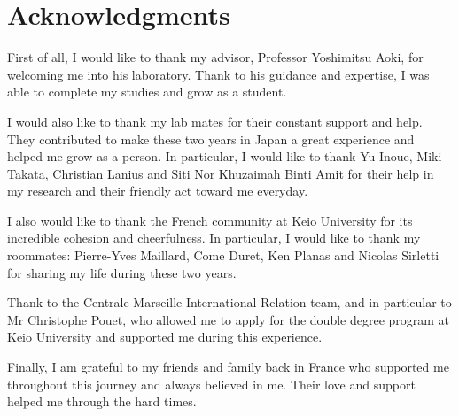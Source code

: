 \chapter*{Acknowledgments}
First of all, I would like to thank my advisor, Professor Yoshimitsu Aoki, for welcoming me into his laboratory. Thank to his guidance and expertise, I was able to complete my studies and grow as a student.

I would also like to thank my lab mates for their constant support and help. They contributed to make these two years in Japan a great experience and helped me grow as a person. In particular, I would like to thank Yu Inoue, Miki Takata, Christian Lanius and Siti Nor Khuzaimah Binti Amit for their help in my research and their friendly act toward me everyday.

I also would like to thank the French community at Keio University for its incredible cohesion and cheerfulness. In particular, I would like to thank my roommates: Pierre-Yves Maillard, Come Duret, Ken Planas and Nicolas Sirletti for sharing my life during these two years.

Thank to the Centrale Marseille International Relation team, and in particular to Mr Christophe Pouet, who allowed me to apply for the double degree program at Keio University and supported me during this experience.

Finally, I am grateful to my friends and family back in France who supported me throughout this journey and always believed in me. Their love and support helped me through the hard times.